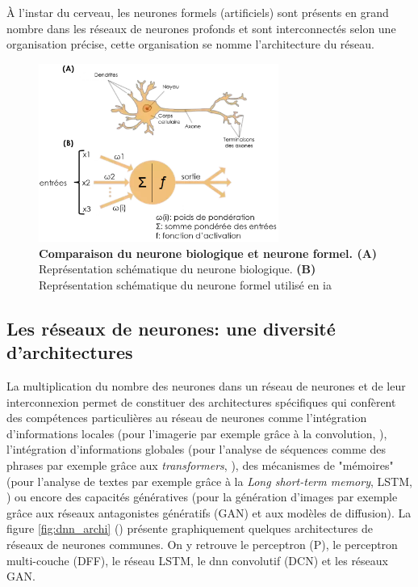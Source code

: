 À l'instar du cerveau, les neurones formels (artificiels) sont présents en grand nombre dans les réseaux de neurones profonds et sont interconnectés selon une organisation précise, cette organisation se nomme l'architecture du réseau.
\begin{figure}[!htbp]
 \centering
 \includegraphics[width=0.7\textwidth]{figures/neuronne.png}
 \caption[Comparaison du neurone biologique et du neurone formel]{\textbf{Comparaison du neurone biologique et neurone formel. (A)} Représentation schématique du neurone biologique. \textbf{(B)} Représentation schématique du neurone formel utilisé en \gls{ia}}
 \label{fig:neurons}
\end{figure}
\subsection{Les réseaux de neurones: une diversité d'architectures}
La multiplication du nombre des neurones dans un réseau de neurones et de leur interconnexion permet de constituer des architectures spécifiques qui confèrent des compétences particulières au réseau de neurones comme l'intégration d'informations locales (pour l'imagerie par exemple grâce à la convolution, \cite{fukushima_neocognitron_1980}), l'intégration d'informations globales (pour l'analyse de séquences comme des phrases par exemple grâce aux \textit{transformers}, \cite{vaswani_attention_2017}), des mécanismes de "mémoires" (pour l'analyse de textes par exemple grâce à la \textit{Long short-term memory}, LSTM, \cite{hochreiter_long_1997}) ou encore des capacités génératives (pour la génération d'images par exemple grâce aux réseaux antagonistes génératifs (GAN) et aux modèles de diffusion). La figure \ref{fig:dnn_archi} (\cite{leijnen_neural_2016}) présente graphiquement quelques architectures de réseaux de neurones communes. On y retrouve le perceptron (P), le perceptron multi-couche (DFF), le réseau LSTM, le \gls{dnn} convolutif (DCN) et les réseaux GAN.

